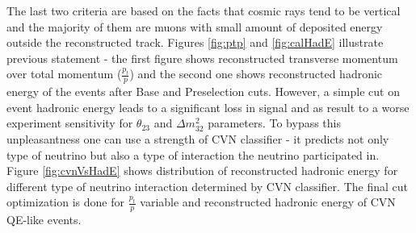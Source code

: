 The last two criteria are based on the facts that cosmic rays tend to be vertical and the majority of them are 
muons with small amount of deposited energy outside the reconstructed track. Figures \ref{fig:ptp} and \ref{fig:calHadE}
illustrate previous statement - the first figure shows reconstructed transverse momentum over total momentum 
($\frac{p_t}{p}$) and the second one shows reconstructed hadronic energy of the events after Base and Preselection 
cuts. However, a simple cut on event hadronic energy leads to a significant loss in signal and as result to a 
worse experiment sensitivity for $\theta_{23}$ and $\Delta m^2_{32}$ parameters. To bypass this unpleasantness one 
can use a strength of CVN classifier - it predicts not only type of neutrino but also a type of interaction the 
neutrino participated in. Figure \ref{fig:cvnVsHadE} shows distribution of reconstructed hadronic energy for 
different type of neutrino interaction determined by CVN classifier. The final cut optimization is done for 
$\frac{p_t}{p}$ variable and reconstructed hadronic energy of CVN QE-like events.

